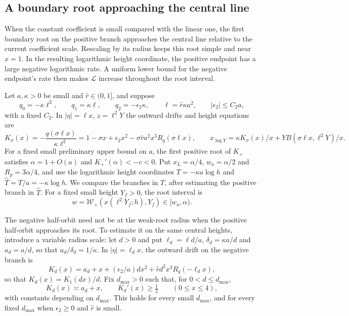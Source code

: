 \subsection{A boundary root approaching the central line}
\label{sec:weak-root-passage}

When the constant coefficient is small compared with the linear one,
the first boundary root on the positive branch approaches the central
line relative to the current coefficient scale. Rescaling by its radius
keeps this root simple and near \(x=1\). In the resulting logarithmic
height coordinate, the positive endpoint has a large negative
logarithmic rate. A uniform lower bound for the negative endpoint's
rate then makes \(\mathcal L\) increase throughout the root interval.

Let \(a,\kappa>0\) be small and \(\hat r\in(0,1]\), and suppose
\begin{equation}
\label{eq:weak-root-scales}
 q_0=-\kappa\ell^2,\qquad q_1=\kappa\ell,\qquad q_2=-\epsilon_2\kappa,
 \qquad \ell=\hat r\kappa a^2,\qquad |\epsilon_2|\le C_2a,
\end{equation}
with a fixed \(C_2\). In \(|\eta|=\ell x\), \(z=\ell^2Y\) the outward
drifts and height equations are
\[
 K_\sigma(x)=-\frac{q(\sigma\ell x)}{\kappa\ell^2}
 =1-\sigma x+\epsilon_2x^2-\sigma\hat ra^2x^3R_q(\sigma\ell x),\qquad
 x_{\log Y}=\kappa K_\sigma(x)/x+YB(\sigma\ell x,\ell^2Y)/x .
\]
For a fixed small preliminary upper bound on \(a\), the first positive
root of \(K_+\) satisfies \(\alpha=1+O(a)\) and \(K_+'(\alpha)<-c<0\).
Put \(x_L=\alpha/4\), \(w_a=\alpha/2\) and \(R_p=3\alpha/4\), and use
the logarithmic height coordinates \(T=-\kappa a\log h\) and
\(\widehat T=T/a=-\kappa\log h\).
We compare the branches in \(T\), after estimating the positive branch
in \(\widehat T\).
For a fixed small height \(Y_f>0\), the root interval is
\begin{equation}
\label{eq:weak-root-interval}
 w=\mathcal W_+(x(\ell^2Y_f;h),Y_f)\in[w_a,\alpha).
\end{equation}

The negative half-orbit need not be at the weak-root radius when the
positive half-orbit approaches its root. To estimate it on the same
central heights, introduce a variable radius scale: let \(d>0\)
and put \(\ell_d=\ell d/a\), \(\delta_d=\kappa a/d\) and
\(a_d=a/d\), so that \(a_d/\delta_d=1/\kappa\).
In \(|\eta|=\ell_dx\), the outward drift on the negative branch is
\[
 K_d(x)=a_d+x+(\epsilon_2/a)dx^2+\hat rd^2x^3R_q(-\ell_dx),
\]
so that \(K_d(x)=K_1(dx)/d\).
Fix \(d_{\max}>0\) such that, for \(0<d\le d_{\max}\),
\begin{equation}
\label{eq:weak-root-negative-drift}
 K_d(x)\asymp a_d+x,\qquad K_d'(x)\ge\tfrac12\qquad(0\le x\le4),
\end{equation}
with constants depending on \(d_{\max}\). This holds for every small
\(d_{\max}\), and for every fixed \(d_{\max}\) when \(\epsilon_2\ge0\) and
\(\hat r\) is small.

